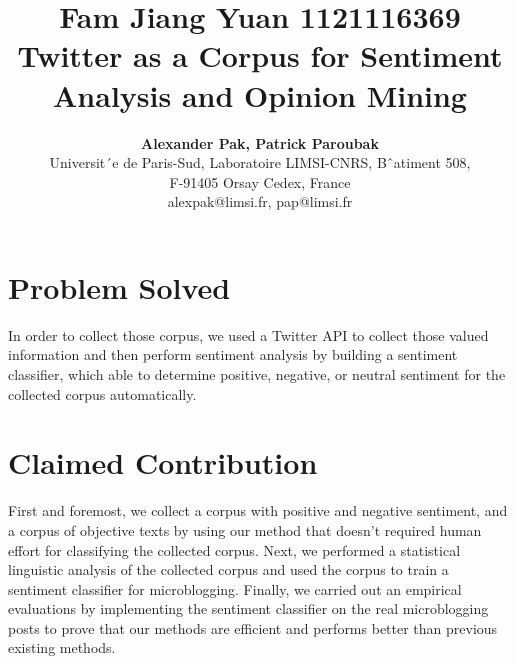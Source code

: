 \documentclass[a4paper,12pt]{article}
\begin{document}


\title{\textbf{{\large Fam Jiang Yuan 1121116369}\vspace{5mm}\\Twitter as a Corpus for Sentiment Analysis and Opinion Mining}}
\author{\textbf{Alexander Pak, Patrick Paroubak}\vspace{5mm} \\Universit´e de Paris-Sud, Laboratoire LIMSI-CNRS, Bˆatiment 508,\\
F-91405 Orsay Cedex, France\\
alexpak@limsi.fr, pap@limsi.fr}
\date{}
\maketitle


\section*{\textbf{Problem Solved}}
In order to collect those corpus, we used a Twitter API to collect those valued information and then perform sentiment analysis by building a sentiment classifier, which able to determine positive, negative, or neutral sentiment for the collected corpus automatically.

\section*{\textbf{Claimed Contribution}}
First and foremost, we collect a corpus with positive and negative sentiment, and a corpus of objective texts by using our method that doesn't required human effort for classifying the collected corpus.
Next, we performed a statistical linguistic analysis of the collected corpus and used the corpus to train a sentiment classifier for microblogging.
Finally, we carried out an empirical evaluations by implementing the sentiment classifier on the real microblogging posts to prove that our methods are efficient and performs better than previous existing methods.
\end{document}
